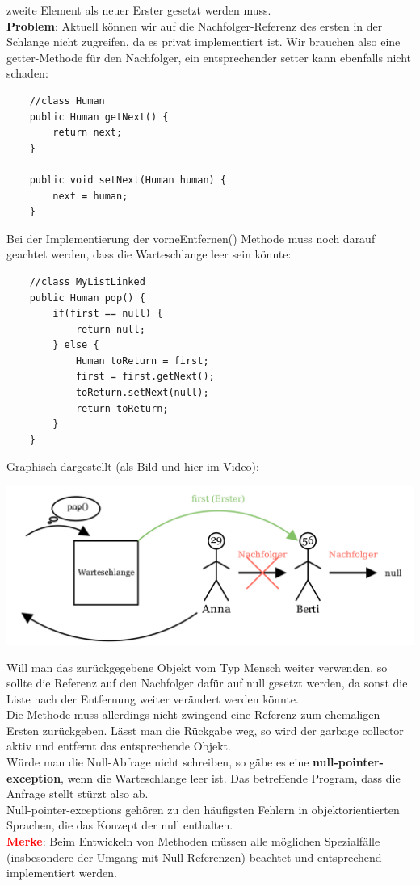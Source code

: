 \documentclass{article}
\begin{document}
zweite Element als neuer Erster gesetzt werden muss. \\
\textbf{Problem}: Aktuell können wir auf die Nachfolger-Referenz des ersten in der Schlange nicht zugreifen, da 
es privat implementiert ist. Wir brauchen also eine getter-Methode für den Nachfolger, ein entsprechender setter kann ebenfalls nicht schaden:
\begin{verbatim}
    //class Human
    public Human getNext() {
        return next;
    }

    public void setNext(Human human) {
        next = human;
    }
\end{verbatim}
Bei der Implementierung der vorneEntfernen() Methode muss noch darauf geachtet werden, dass die Warteschlange 
leer sein könnte:
\begin{verbatim}
    //class MyListLinked 
    public Human pop() {
        if(first == null) {
            return null;
        } else {
            Human toReturn = first;
            first = first.getNext();
            toReturn.setNext(null);
            return toReturn;
        }
    }
\end{verbatim}
Graphisch dargestellt (als Bild und \href{https://youtu.be/ceQII7Bn9ts}{hier} im Video):
\begin{center}
    \includegraphics[scale = 0.2]{../media/linked_list_pop.png}
\end{center}
Will man das zurückgegebene Objekt vom Typ Mensch weiter verwenden, so sollte die Referenz auf den 
Nachfolger dafür auf null gesetzt werden, da sonst die Liste nach der Entfernung weiter verändert werden könnte. \\
Die Methode muss allerdings nicht zwingend eine Referenz zum ehemaligen Ersten zurückgeben. Lässt man die Rückgabe weg, so wird der garbage collector aktiv und entfernt das entsprechende Objekt. \\
Würde man die Null-Abfrage nicht schreiben, so gäbe es eine \textbf{null-pointer-exception}, wenn die Warteschlange 
leer ist. Das betreffende Program, dass die Anfrage stellt stürzt also ab. \\
Null-pointer-exceptions gehören zu den häufigsten Fehlern in objektorientierten Sprachen, die das Konzept der 
null enthalten. \\
\textbf{\textcolor{red}{Merke}}: Beim Entwickeln von Methoden müssen alle möglichen Spezialfälle (insbesondere der
Umgang mit Null-Referenzen) beachtet und entsprechend implementiert werden. \\
\end{document}
